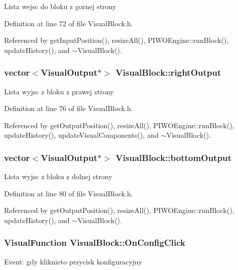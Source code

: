 Lista wejsc do bloku z gornej strony 

Definition at line 72 of file VisualBlock.h.

Referenced by getInputPosition(), resizeAll(), PIWOEngine::runBlock(), updateHistory(), and $\sim$VisualBlock().\hypertarget{classVisualBlock_e87bdb704a2ac4af6bc51b34456fdd1d}{
\subsubsection[rightOutput]{\setlength{\rightskip}{0pt plus 5cm}vector$<${\bf VisualOutput}$\ast$$>$ {\bf VisualBlock::rightOutput}}}
\label{classVisualBlock_e87bdb704a2ac4af6bc51b34456fdd1d}


Lista wyjsc z bloku z prawej strony 

Definition at line 76 of file VisualBlock.h.

Referenced by getOutputPosition(), resizeAll(), PIWOEngine::runBlock(), updateHistory(), updateVisualComponents(), and $\sim$VisualBlock().\hypertarget{classVisualBlock_c20150edf6b145056e52ef811d3e977a}{
\subsubsection[bottomOutput]{\setlength{\rightskip}{0pt plus 5cm}vector$<${\bf VisualOutput}$\ast$$>$ {\bf VisualBlock::bottomOutput}}}
\label{classVisualBlock_c20150edf6b145056e52ef811d3e977a}


Lista wyjsc z bloku z dolnej strony 

Definition at line 80 of file VisualBlock.h.

Referenced by getOutputPosition(), resizeAll(), PIWOEngine::runBlock(), updateHistory(), and $\sim$VisualBlock().\hypertarget{classVisualBlock_b342e90eddc48bc614d0a9da48f0e7e4}{
\subsubsection[OnConfigClick]{\setlength{\rightskip}{0pt plus 5cm}VisualFunction {\bf VisualBlock::OnConfigClick}}}
\label{classVisualBlock_b342e90eddc48bc614d0a9da48f0e7e4}


Event: gdy kliknieto przycisk konfiguracyjny 

